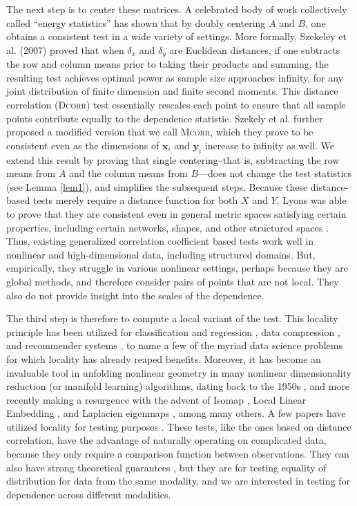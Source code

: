 \documentclass[11pt]{article}
\providecommand{\sct}[1]{{\normalfont\textsc{#1}}}
\providecommand{\mb}[1]{\boldsymbol{#1}}
\newcommand{\Dcorr}{\sct{Dcorr}}
\newcommand{\Mcorr}{\sct{Mcorr}}
\begin{document}
The next step is to center these matrices.  A celebrated body of  work collectively called ``energy statistics'' \cite{RizzoSzekely2016} has shown that by doubly centering $A$ and $B$, one obtains a consistent test in a wide variety of settings.  
More formally, Szekeley et al. (2007) \cite{SzekelyRizzoBakirov2007} proved that when  $\delta_x$ and $\delta_y$  are  Euclidean distances, if one subtracts the row and column means prior to taking their products and summing, the resulting test achieves optimal power as 
sample size approaches infinity, for any joint distribution of finite dimension and finite second moments. 
This distance correlation (\Dcorr) test essentially rescales each point to ensure that all sample points contribute equally to the dependence statistic. 
Szekely et al. \cite{SzekelyRizzo2013a} further proposed a modified version that we call \Mcorr, which they prove to be consistent even as the dimensions of $\mb{x}_i$ and $\mb{y}_i$ increase to infinity as well.
We extend this result by proving that single centering--that is, subtracting the row means from $A$ and the column means from $B$---does not change the test statistics (see Lemma \ref{lem1}), and simplifies the subsequent steps.
Because these distance-based tests merely require a distance function for both $X$ and $Y$, Lyons was able to prove that they are consistent even in general metric spaces satisfying certain properties, including certain networks, shapes, and other structured spaces  \cite{Lyons2013}.
Thus, existing generalized correlation coefficient based tests  work well in nonlinear and high-dimensional data,  including structured domains. But, empirically, they struggle in various nonlinear settings, perhaps because they are global methods, and therefore consider pairs of points that are not local. They also do not provide insight into the scales of the dependence.

The third step is therefore to compute a local variant of the test.
This locality principle has been utilized for classification and regression  \cite{Stone1977}, data compression \cite{DaubechiesWaveletBook}, and recommender systems \cite{Sarwar2000}, to name a few of the myriad data science problems for which locality has already reaped benefits.
Moreover, it has become an invaluable tool in unfolding nonlinear geometry in many nonlinear dimensionality reduction (or manifold learning) algorithms, dating back to the 1950s \cite{TorgersonBook}, and more recently making a resurgence with the advent of Isomap \cite{TenenbaumSilvaLangford2000, SilvaTenenbaum2003}, Local Linear Embedding \cite{SaulRoweis2000, RoweisSaul2003}, and Laplacien eigenmaps \cite{BelkinNiyogi2003}, among many others. A few papers have utilized locality for testing purposes 
\cite{David1966,Friedman1983,Schilling1986}.  These tests, like the ones based on distance correlation, have the advantage of naturally operating on complicated data, because they only require a comparison function between observations.  They can also have strong theoretical guarantees \cite{Maa1996}, but they are for testing equality of distribution for data from the same modality, and we are interested in testing for dependence across different modalities. 
\end{document}
